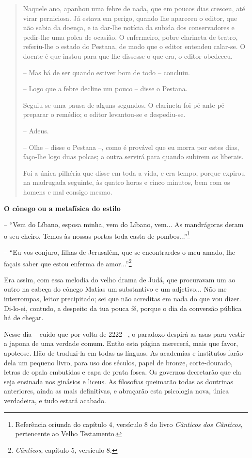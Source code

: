\begin{quote}
Naquele ano, apanhou uma febre de nada, que em poucos dias cresceu, até
virar perniciosa. Já estava em perigo, quando lhe apareceu o editor, que
não sabia da doença, e ia dar-lhe notícia da subida dos conservadores e
pedir-lhe uma polca de ocasião. O enfermeiro, pobre clarineta de teatro,
referiu-lhe o estado do Pestana, de modo que o editor entendeu calar-se.
O doente é que instou para que lhe dissesse o que era, o editor
obedeceu.

-- Mas há de ser quando estiver bom de todo -- concluiu.

-- Logo que a febre decline um pouco -- disse o Pestana.

Seguiu-se uma pausa de alguns segundos. O clarineta foi pé ante pé
preparar o remédio; o editor levantou-se e despediu-se.

-- Adeus.

-- Olhe -- disse o Pestana --, como é provável que eu morra por estes
dias, faço-lhe logo duas polcas; a outra servirá para quando subirem os
liberais.

Foi a única pilhéria que disse em toda a vida, e era tempo, porque
expirou na madrugada seguinte, às quatro horas e cinco minutos, bem com
os homens e mal consigo mesmo.
\end{quote}

\textbf{O cônego ou a metafísica do estilo}

-- ``Vem do Líbano, esposa minha, vem do Líbano, vem... As mandrágoras
deram o seu cheiro. Temos às nossas portas toda casta de
pombos...''\footnote{Referência oriunda do capítulo 4, versículo 8 do
  livro \emph{Cânticos dos Cânticos}, pertencente ao Velho Testamento.}

-- ``Eu vos conjuro, filhas de Jerusalém, que se encontrardes o meu
amado, lhe façais saber que estou enferma de amor...''\footnote{\emph{Cânticos},
  capítulo 5, versículo 8.}

Era assim, com essa melodia do velho drama de Judá, que procuravam um ao
outro na cabeça do cônego Matias um substantivo e um adjetivo... Não me
interrompas, leitor precipitado; sei que não acreditas em nada do que
vou dizer. Di-lo-ei, contudo, a despeito da tua pouca fé, porque o dia
da conversão pública há de chegar.

Nesse dia -- cuido que por volta de 2222 --, o paradoxo despirá as asas
para vestir a japona de uma verdade comum. Então esta página merecerá,
mais que favor, apoteose. Hão de traduzi-la em todas as línguas. As
academias e institutos farão dela um pequeno livro, para uso dos
séculos, papel de bronze, corte-dourado, letras de opala embutidas e
capa de prata fosca. Os governos decretarão que ela seja ensinada nos
ginásios e liceus. As filosofias queimarão todas as doutrinas
anteriores, ainda as mais definitivas, e abraçarão esta psicologia nova,
única verdadeira, e tudo estará acabado.

